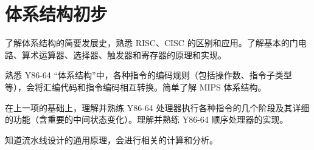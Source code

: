 \chapter{体系结构初步}
    \begin{summary}
        \begin{compactitem}
            \item 了解体系结构的简要发展史，熟悉 RISC、CISC 的区别和应用。了解基本的门电路、算术运算器、选择器、触发器和寄存器的原理和实现。
            \item 熟悉 Y86-64 “体系结构”中，各种指令的编码规则（包括操作数、指令子类型等），会将汇编代码和指令编码相互转换。简单了解 MIPS 体系结构。
            \item 在上一项的基础上，理解并熟练 Y86-64 处理器执行各种指令的几个阶段及其详细的功能（含重要的中间状态变化）。理解并熟练 Y86-64 顺序处理器的实现。
            \item 知道流水线设计的通用原理，会进行相关的计算和分析。
        \end{compactitem}
    \end{summary}

